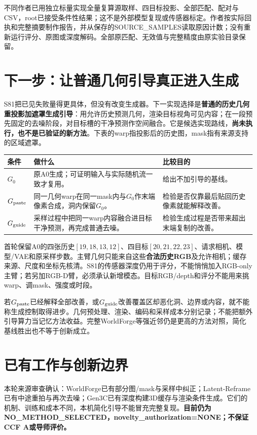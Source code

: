 \documentclass[UTF8,11pt,a4paper]{ctexart}
\begin{document}

不同作者已用独立标量实现全量复算源取样、四目标投影、全部匹配、配对与CSV，root已接受条件性结果；这不是外部模型复现或传感器标定。作者按实际回执和完整摘要制作报告，并从保存的SOURCE\_SAMPLES读取原因计数；没有重新运行评分、原图或深度解码。全部原匹配、无效值与完整精度由原实验目录保留。
\clearpage
\section{ 下一步：让普通几何引导真正进入生成}
S81把已见失败量得更具体，但没有改变生成器。下一实现选择是\textbf{普通的历史几何重投影加遮罩生成引导}：用允许历史预测几何，渲染目标视角可见内容；在一段预先固定的去噪阶段，对目标槽的干净预测作空间融合。它是候选实现路线，\textbf{尚未执行，也不是已验证的新方法}。下表的warp指投影后的历史图，mask指有来源支持的区域遮罩。

\begin{center}\small
\begin{tabular}{p{2.0cm}p{7.2cm}p{6.0cm}}\toprule
条件&做什么&比较目的\\\midrule
$G_0$&原A0生成；可证明输入与实际随机流一致才复用。&给出不加引导的基线。\\
$G_{\rm paste}$&同一几何warp在同一mask内与$G_0$作末端像素合成，洞内保留$G_0$。&检验是否仅靠最后贴回历史像素就能解释改善。\\
$G_{\rm guide}$&采样过程中把同一warp内容融合进目标干净预测，再完成普通去噪。&检验生成过程是否带来超出末端复制的改善。\\\bottomrule
\end{tabular}\end{center}

首轮保留A0的四张历史$[19,18,13,12]$、四目标$[20,21,22,23]$、请求相机、模型/VAE和原采样步数。主臂几何只能来自这些\textbf{合法历史RGB}及允许相机；缓存来源、尺度和坐标先核清。S81的传感器深度仍用于评分，不能悄悄加入RGB-only主臂；若另加RGB-D臂，必须承认新增模态。目标RGB/depth和评分不能用来挑warp、调mask、强度或时段。

若$G_{\rm paste}$已经解释全部改善，或$G_{\rm guide}$改善覆盖区却恶化洞、边界或内容，就不能称生成控制取得进步。几何预处理、渲染、编码和采样成本分别记录；不能把额外引导算力当记忆方法收益。完整WorldForge等强近邻仍是更高的方法对照，简化基线胜出也不等于创新成立。

\section{ 已有工作与创新边界}
本轮来源审查确认：WorldForge已有部分图/mask与采样中纠正；Latent-Reframe已有中途重拍与再次去噪；Gen3C已有深度构建3D缓存与渲染条件生成。它们的机制、训练和成本不同，本机简化引导不能冒充完整复现。\textbf{目前仍为NO\_METHOD\_SELECTED，novelty\_authorization=NONE；不保证CCF A或导师评价。}
\end{document}
